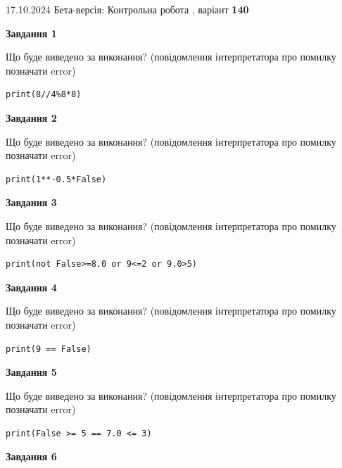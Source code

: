 \documentclass[12pt, ukrainian]{article}
\begin{document}
{\Large{17.10.2024 Бета-версія: Контрольна робота , варіант  \No \textbf { 140 }\par}}
{
\begin {large}
{\begin {center}\textbf{Завдання 1}\end {center}}

Що буде виведено за виконання? (повідомлення інтерпретатора про помилку позначати error)\par
\begin{verbatim}
print(8//4%8*8)
\end{verbatim}

{\begin {center}\textbf{Завдання 2}\end {center}}

Що буде виведено за виконання? (повідомлення інтерпретатора про помилку позначати error)\par
\begin{verbatim}
print(1**-0.5*False)
\end{verbatim}

{\begin {center}\textbf{Завдання 3}\end {center}}

Що буде виведено за виконання? (повідомлення інтерпретатора про помилку позначати error)\par
\begin{verbatim}
print(not False>=8.0 or 9<=2 or 9.0>5)
\end{verbatim}

{\begin {center}\textbf{Завдання 4}\end {center}}

Що буде виведено за виконання? (повідомлення інтерпретатора про помилку позначати error)\par
\begin{verbatim}
print(9 == False)
\end{verbatim}

{\begin {center}\textbf{Завдання 5}\end {center}}

Що буде виведено за виконання? (повідомлення інтерпретатора про помилку позначати error)\par
\begin{verbatim}
print(False >= 5 == 7.0 <= 3)
\end{verbatim}

{\begin {center}\textbf{Завдання 6}\end {center}}


\end{large}}
\end{document}
